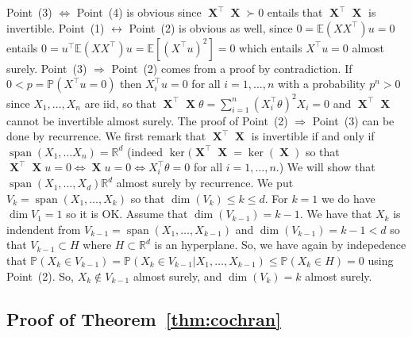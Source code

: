 \documentclass[
	fontsize=11pt, %
	twoside=false, %
	numbers=noenddot, %
]{kaobook}
\DeclareMathOperator{\bX}{{\boldsymbol X}}
\DeclareMathOperator*{\spa}{span}
\renewcommand{\P}{\mathbb P}
\newcommand{\E}{\mathbb E}
\newcommand{\R}{\mathbb R}
\begin{document}
Point~(3) $\Leftrightarrow$ Point~(4) is obvious since $\bX^\top \bX \succ 0$ entails that $\bX^\top \bX$ is invertible. Point~(1) $\leftrightarrow$ Point~(2) is obvious as well, since $0 = \E(X X^\top) u = 0$ entails $0 = u^\top \E(X X^\top) u = \E[ (X^\top u)^2] = 0$ which entails $X^\top u = 0$ almost surely. Point~(3) $\Rightarrow$ Point~(2) comes from a proof by contradiction. If $0 < p = \P(X^\top u = 0)$ then $X_i^\top u = 0$ for all $i=1, \ldots, n$ with a probability $p^n > 0$ since $X_1, \ldots, X_n$ are iid, so that $\bX^\top \bX \theta = \sum_{i=1}^n (X_i^\top \theta)^2 X_i = 0$ and $\bX^\top \bX$ cannot be invertible almost surely.
The proof of Point~(2) $\Rightarrow$ Point~(3) can be done by recurrence. We first remark that $\bX^\top \bX$ is invertible if and only if $\spa(X_1, \ldots X_n) = \R^d$ (indeed $\ker(\bX^\top \bX = \ker(\bX)$ so that $\bX^\top \bX u = 0 \Leftrightarrow \bX u = 0 \Leftrightarrow X_i^\top \theta = 0$ for all $i=1, \ldots, n$.) We will show that $\spa(X_1, \ldots, X_d) \R^d$ almost surely by recurrence. We put $V_k = \spa(X_1, \ldots, X_k)$ so that $\dim(V_k) \leq k \leq d$. For $k=1$ we do have $\dim V_1 = 1$ so it is OK. Assume that $\dim(V_{k-1}) = k-1$. We have that $X_k$ is indendent from $V_{k-1} = \spa(X_1, \ldots, X_{k-1})$ and $\dim(V_{k-1}) = k-1 < d$ so that $V_{k-1} \subset H$ where $H \subset \R^d$ is an hyperplane. So, we have again by indepedence that $\P(X_k \in V_{k-1}) = \P(X_k \in V_{k-1} | X_1, \ldots, X_{k-1}) \leq \P(X_k \in H) = 0$ using Point~(2). So, $X_k \notin V_{k-1}$ almost surely, and $\dim(V_k) = k$ almost surely.


\subsection{Proof of Theorem~\ref{thm:cochran}} %
\end{document}
